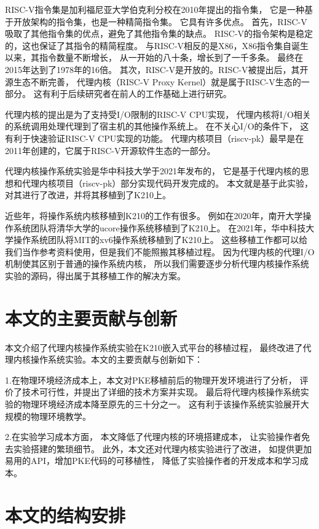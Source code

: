 RISC-V指令集是加利福尼亚大学伯克利分校在2010年提出的指令集，
它是一种基于开放架构的指令集，也是一种精简指令集。
它具有许多优点。
首先，RISC-V吸取了其他指令集的优点，避免了其他指令集的缺点。
RISC-V的指令架构是稳定的，这也保证了其指令的精简程度。
与RISC-V相反的是X86，X86指令集自诞生以来，其指令数量不断增长，
从一开始的八十条，增长到了一千多条。
最终在2015年达到了1978年的16倍。
其次，RISC-V是开放的。RISC-V被提出后，其开源生态不断完善，
代理内核（RISC-V Proxy Kernel）就是属于RISC-V生态的一部分。
这有利于后续研究者在前人的工作基础上进行研究。

代理内核的提出是为了支持受I/O限制的RISC-V CPU实现，
代理内核将I/O相关的系统调用处理代理到了宿主机的其他操作系统上。
在不关心I/O的条件下，
这有利于快速验证RISC-V CPU实现的功能。
代理内核项目（riscv-pk）最早是在2011年创建的，它属于RISC-V开源软件生态的一部分。

代理内核操作系统实验是华中科技大学于2021年发布的，
它是基于代理内核的思想和代理内核项目（riscv-pk）部分实现代码开发完成的。
本文就是基于此实验，对其进行了改进，并将其移植到了K210上。

近些年，将操作系统内核移植到K210的工作有很多。
例如在2020年，南开大学操作系统团队将清华大学的ucore操作系统移植到了K210上。
在2021年，华中科技大学操作系统团队将MIT的xv6操作系统移植到了K210上。
这些移植工作都可以给我们当作参考资料使用，但是我们不能照搬其移植过程。
因为代理内核的代理I/O机制使其区别于普通的操作系统内核，
所以我们需要逐步分析代理内核操作系统实验的源码，得出属于其移植工作的解决方案。



\section{本文的主要贡献与创新}

本文介绍了代理内核操作系统实验在K210嵌入式平台的移植过程，
最终改进了代理内核操作系统实验。本文的主要贡献与创新如下：

1.在物理环境经济成本上，本文对PKE移植前后的物理开发环境进行了分析，
评价了技术可行性，并提出了详细的技术方案并实现。
最后将代理内核操作系统实验的物理环境经济成本降至原先的三十分之一。
这有利于该操作系统实验展开大规模的物理环境教学。

2.在实验学习成本方面，
本文降低了代理内核的环境搭建成本，
让实验操作者免去实验搭建的繁琐细节。
此外，本文还对代理内核实验进行了改进，
如提供更加易用的API，增加PKE代码的可移植性，
降低了实验操作者的开发成本和学习成本。

\section{本文的结构安排}


